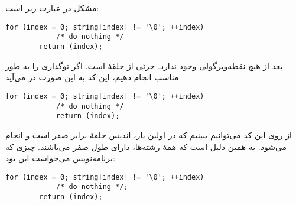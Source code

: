 \section{}
\paragraph{}\label{answer:97}
مشکل در عبارت زیر است:
\begin{LTR}
    \begin{lstlisting}[style=C++Style]
        for (index = 0; string[index] != '\0'; ++index)
            /* do nothing */
        return (index);
    \end{lstlisting}
\end{LTR}

بعد از  هیچ نقطه‌ویرگولی وجود ندارد.  جزئی از حلقهٔ  است. اگر توگذاری را به طور مناسب انجام دهیم، این کد به این صورت در می‌آید:
\begin{LTR}
    \begin{lstlisting}[style=C++Style]
        for (index = 0; string[index] != '\0'; ++index)
            /* do nothing */
            return (index);
    \end{lstlisting}
\end{LTR}

از روی این کد می‌توانیم ببینیم که در اولین بار، اندیس حلقهٔ  برابر صفر است و  انجام می‌شود. به همین دلیل است که همهٔ رشته‌ها، دارای طول صفر می‌باشند. چیزی که برنامه‌نویس می‌خواست این بود:
\begin{LTR}
    \begin{lstlisting}[style=C++Style]
        for (index = 0; string[index] != '\0'; ++index)
            /* do nothing */;
        return (index);
    \end{lstlisting}
\end{LTR}
